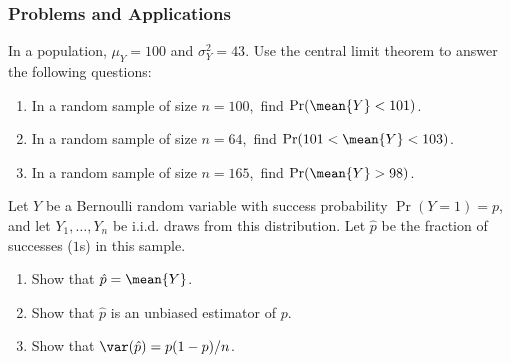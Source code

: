 

\begin{frame}
\frametitle{Problems and Applications}
In a population, $\mu_{Y}=100$ and $\sigma^2_{Y}=43$. Use the central limit theorem to answer the following questions:
\begin{enumerate}
\item In a random sample of size $n=100$,\, find $\text{Pr}(\mean{Y}<101)$.
\item In a random sample of size $n=64$,\, find $\text{Pr}(101<\mean{Y}<103)$.
\item In a random sample of size $n=165$,\, find $\text{Pr}(\mean{Y}>98)$.
\end{enumerate}
\medskip
\pause
{}
Let $Y$ be a Bernoulli random variable with success probability $\Pr(Y=1)=p$, and let $Y_1,\ldots,Y_n$ be i.i.d. draws from this distribution. Let $\hat{p}$ be the fraction of successes ($1$s) in this sample.
\begin{enumerate}
\item Show that $\hat{p} = \mean{Y}$.
\item Show that $\hat{p}$ is an unbiased estimator of $p$.
\item Show that $\var(\hat{p})=p(1-p)/n$.
\end{enumerate}
\end{frame}

